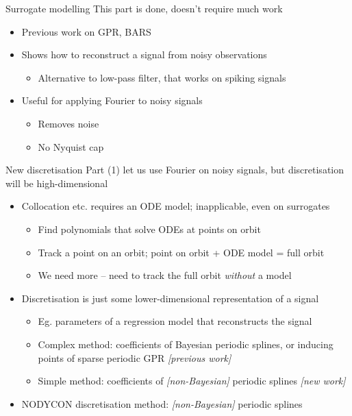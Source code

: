 \documentclass[presentation]{beamer}
\begin{document}
\begin{frame}[label={sec:org1156a9f}]{Surrogate modelling}
This part is done, doesn't require much work
\vfill
\begin{itemize}
\item Previous work on GPR, BARS
\item Shows how to reconstruct a signal from noisy observations
\begin{itemize}
\item Alternative to low-pass filter, that works on spiking signals
\end{itemize}
\item Useful for applying Fourier to noisy signals
\begin{itemize}
\item Removes noise
\item \alert{No Nyquist cap}
\end{itemize}
\end{itemize}
\end{frame}


\begin{frame}[label={sec:org2bc490a}]{New discretisation}
Part (1) let us use Fourier on noisy signals, but discretisation will be high-dimensional
\begin{itemize}[<+->]
\item Collocation etc. requires an ODE model; inapplicable, even on surrogates
\begin{itemize}
\item Find polynomials that solve ODEs at points on orbit
\item Track a point on an orbit; point on orbit + ODE model = full orbit
\item We need more -- need to track the full orbit \emph{without} a model
\end{itemize}
\item Discretisation is just some lower-dimensional representation of a signal
\begin{itemize}
\item Eg. parameters of a regression model that reconstructs the signal
\item Complex method: coefficients of Bayesian periodic splines, or inducing points of sparse periodic GPR \emph{[previous work]}
\item Simple method: coefficients of \emph{[non-Bayesian]} periodic splines \emph{[new work]}
\end{itemize}
\item NODYCON discretisation method: \emph{[non-Bayesian]} periodic splines
\end{itemize}
\end{frame}
\end{document}
